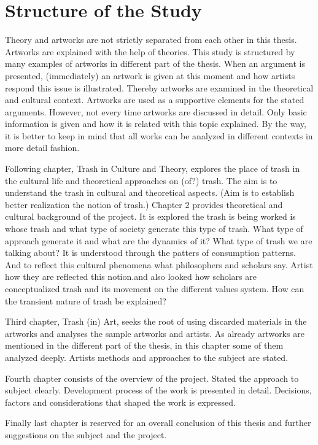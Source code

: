%
\section{Structure of the Study}
Theory and artworks are not strictly separated from each other in this thesis. Artworks are explained with the help of theories. This study is structured by many examples of artworks in different part of the thesis. When an argument is presented, (immediately) an artwork is given at this moment and how artists respond this issue is illustrated. Thereby artworks are examined in the theoretical and cultural context. Artworks are used as a supportive elements for the stated arguments. However, not every time artworks are discussed in detail. Only basic information is given and how it is related with this topic explained. By the way, it is better to keep in mind that all works can be analyzed in different contexts in more detail fashion.


Following chapter, Trash in Culture and Theory, explores the place of trash in the cultural life and theoretical approaches on (of?) trash. The aim is to understand the trash in cultural and theoretical aspects. (Aim is to establish better realization the notion of trash.) Chapter 2 provides theoretical and cultural background of the project. It is explored the trash is being worked is whose trash and what type of society generate this type of trash. What type of approach generate it and what are the dynamics of it? What type of trash we are talking about? It is understood through the patters of consumption patterns. And to reflect this cultural phenomena what philosophers and scholars say. Artist how they are reflected this notion.and also looked how scholars are conceptualized trash and its movement on the different values system. How can the transient nature of trash be explained?

Third chapter, Trash (in) Art, seeks the root of using discarded materials in the artworks and analyses the sample artworks and artists. As already artworks are mentioned in the different part of the thesis, in this chapter some of them analyzed deeply. Artists methods and approaches to the subject are stated.

Fourth chapter consists of the overview of the project. Stated the approach to subject clearly. Development process of the work is presented in detail. Decisions, factors and considerations that shaped the work is expressed.

Finally last chapter is reserved for an overall conclusion of this thesis and further suggestions on the subject and the project.





